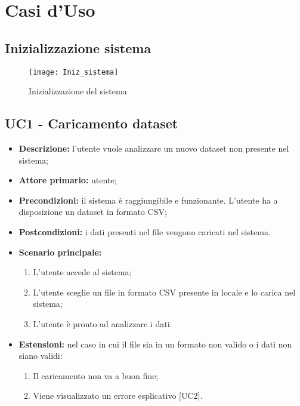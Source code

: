\chapter{Casi d'Uso}

\section*{Inizializzazione sistema}

\begin{figure}[h]
  \centering
  \texttt{[image: Iniz\_sistema]}
  \caption{Inizializzazione del sistema}
\end{figure}
\section{UC1 - Caricamento dataset}
\begin{itemize}
  \item \textbf{Descrizione:} l'utente vuole analizzare un nuovo dataset non presente nel sistema;
  \item \textbf{Attore primario:} utente;
  \item \textbf{Precondizioni:} il sistema è raggiungibile e funzionante. L’utente ha a disposizione un dataset in formato CSV;
  \item \textbf{Postcondizioni:} i dati presenti nel file vengono caricati nel sistema.
  \item \textbf{Scenario principale:}
  \begin{enumerate}
    \item L'utente accede al sistema;
    \item L'utente sceglie un file in formato CSV presente in locale e lo carica nel sistema;
    \item L'utente è pronto ad analizzare i dati.
  \end{enumerate}
  \item \textbf{Estensioni:} nel caso in cui il file sia in un formato non valido o i dati non siano validi:
    \begin{enumerate}
      \item Il caricamento non va a buon fine;
      \item Viene visualizzato un errore esplicativo [UC2].
    \end{enumerate}
\end{itemize}

